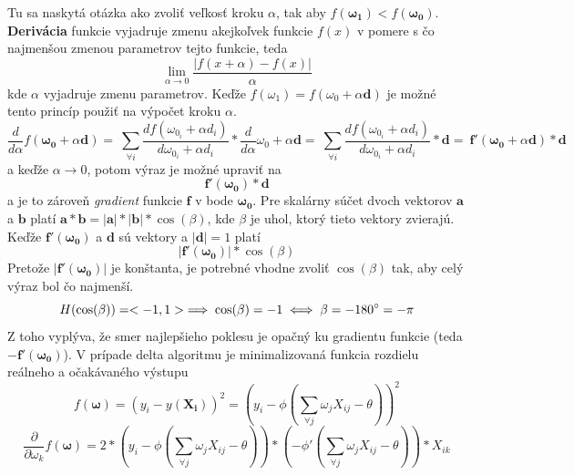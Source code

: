 Tu sa naskytá otázka ako zvoliť veľkosť kroku $\alpha$, tak aby $f(\pmb{\omega_1}) < f(\pmb{\omega_0})$.
\textbf{Derivácia} funkcie vyjadruje zmenu akejkoľvek funkcie $f(x)$ v pomere s čo najmenšou zmenou parametrov tejto
funkcie, teda
\begin{equation}
    \lim_{\alpha\to0}\frac{|f(x + \alpha) - f(x)|}{\alpha}
\end{equation}
kde $\alpha$ vyjadruje zmenu parametrov.
Keďže $f(\omega_1)=f(\omega_0+\alpha\pmb{d})$ je možné tento princíp použiť na výpočet kroku $\alpha$.
\begin{equation}
    \frac{d}{d\alpha}f(\pmb{\omega_0}+\alpha\pmb{d}) = \
    \sum_{\forall i}{\frac{d f(\omega_{0_i} + \alpha{d_i})}{d \omega_{0_i} + \alpha{d_i}}}*\frac{d}{d\alpha}\omega_0+\alpha\pmb{d} = \
    \sum_{\forall i}{\frac{d f(\omega_{0_i} + \alpha{d_i})}{d \omega_{0_i} + \alpha{d_i}}}*\pmb{d} = \
    \pmb{f'}(\pmb{\omega_0}+\alpha\pmb{d})*\pmb{d}
\end{equation}
a keďže $\alpha\to0$, potom výraz je možné upraviť na
\begin{equation}
    \pmb{f'}(\pmb{\omega_0})*\pmb{d}
\end{equation}
a je to zároveň \emph{gradient} funkcie $\pmb{f}$ v bode $\pmb{\omega_0}$.
Pre skalárny súčet dvoch vektorov $\pmb{a}$ a $\pmb{b}$ platí $\pmb{a} * \pmb{b} = |\pmb{a}| * |\pmb{b}| * \cos(\beta)$, kde $\beta$
je uhol, ktorý tieto vektory zvierajú.
Keďže $\pmb{f'}(\pmb{\omega_0})$ a $\pmb{d}$ sú vektory a $|\pmb{d}|=1$ platí
\begin{equation}
    |\pmb{f'}(\pmb{\omega_0})| * \cos(\beta)
\end{equation}
Pretože $|\pmb{f'}(\pmb{\omega_0})|$ je konštanta, je potrebné vhodne zvoliť $\cos(\beta)$ tak, aby celý výraz bol čo
najmenší.
\begin{equation}
    H(\cos(\beta)) = <-1,1> \implies \cos(\beta) = -1 \iff \beta = -180\degree = -\pi
\end{equation}
Z toho vyplýva, že smer najlepšieho poklesu je opačný ku gradientu funkcie (teda $-\pmb{f'}(\pmb{\omega_0})$).
V prípade delta algoritmu je minimalizovaná funkcia rozdielu reálneho a očakávaného výstupu
\begin{equation}
    f(\pmb{\omega})=(y_i-y(\mathbf{X_i}))^2=(y_i-\phi(\sum_{\forall j}{\omega_j X_{ij}-\theta}))^2
\end{equation}
\begin{equation}
    \frac{\partial}{\partial \omega_k}f(\pmb{\omega})=2*(y_i-\phi(\sum_{\forall j}{\omega_j X_{ij}-\theta}))*(-\phi'(\sum_{\forall j}{\omega_j X_{ij}-\theta}))*X_{ik}
\end{equation}
